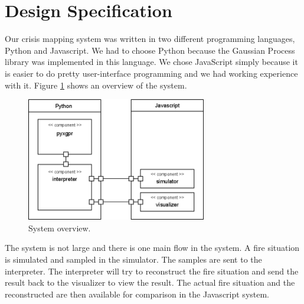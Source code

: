 \section{Design Specification}
Our crisis mapping system was written in two different programming languages, Python and Javascript. We had to choose Python because the Gaussian Process library was implemented in this language. We chose JavaScript simply because it is easier to do pretty user-interface programming and we had working experience with it. Figure \ref{fig:system-overview} shows an overview of the system.

\begin{figure}[here]
  \centering
      \includegraphics[width=0.7\textwidth]{solution/graphics/system-overview.png}
  \caption{System overview.}
  \label{fig:system-overview}
\end{figure}

The system is not large and there is one main flow in the system. A fire situation is simulated and sampled in the simulator. The samples are sent to the interpreter. The interpreter will try to reconstruct the fire situation and send the result back to the visualizer to view the result. The actual fire situation and the reconstructed are then available for comparison in the Javascript system.